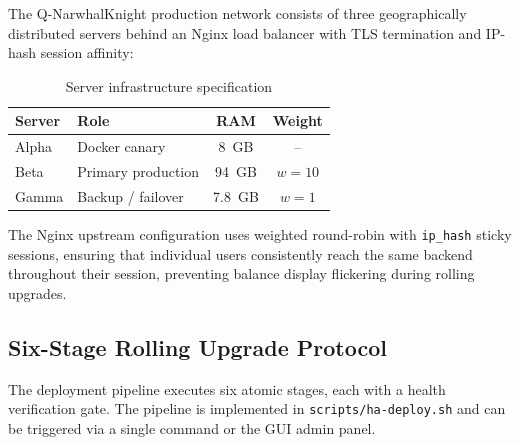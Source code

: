 \documentclass[11pt,a4paper,twocolumn]{article}
\begin{document}
The Q-NarwhalKnight production network consists of three geographically distributed
servers behind an Nginx load balancer with TLS termination and IP-hash session affinity:

\begin{table}[H]
\centering
\caption{Server infrastructure specification}
\label{tab:servers}
\scriptsize
\begin{tabularx}{\columnwidth}{lXcc}
\toprule
\textbf{Server} & \textbf{Role} & \textbf{RAM} & \textbf{Weight} \\
\midrule
Alpha & Docker canary & 8~GB & -- \\
Beta  & Primary production & 94~GB & $w=10$ \\
Gamma & Backup / failover & 7.8~GB & $w=1$ \\
\bottomrule
\end{tabularx}
\end{table}

The Nginx upstream configuration uses weighted round-robin with \texttt{ip\_hash}
sticky sessions, ensuring that individual users consistently reach the same backend
throughout their session, preventing balance display flickering during rolling upgrades.

\subsection{Six-Stage Rolling Upgrade Protocol}

The deployment pipeline executes six atomic stages, each with a health verification
gate. The pipeline is implemented in \texttt{scripts/ha-deploy.sh} and can be
triggered via a single command or the GUI admin panel.
\end{document}
